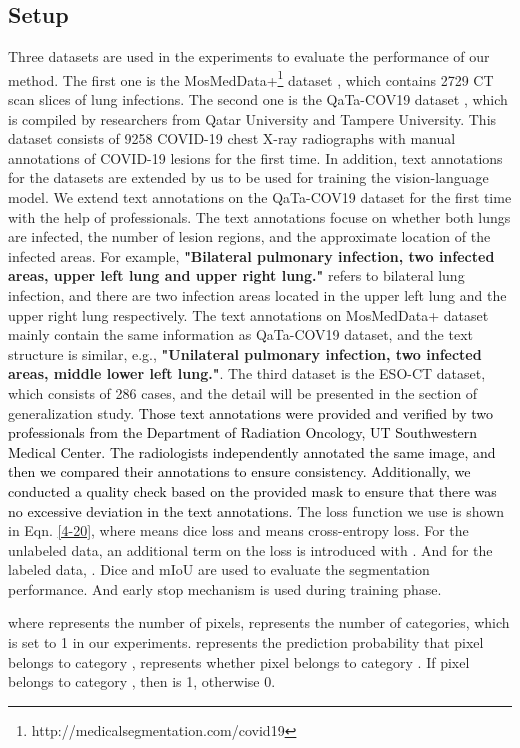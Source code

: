 \documentclass[lettersize,journal]{IEEEtran}
\begin{document}
\subsection{Setup}
Three datasets are used in the experiments to evaluate the performance of our method. The first one is the \renewcommand{\thefootnote}{\arabic{footnote}}{MosMedData+\footnote{http://medicalsegmentation.com/covid19}} dataset \cite{morozov2020mosmeddata,hofmanninger2020automatic}, which contains 2729 CT scan slices of lung infections. The second one is the QaTa-COV19 dataset \cite{48degerli2022osegnet}, which is compiled by researchers from Qatar University and Tampere University. This dataset consists of 9258 COVID-19 chest X-ray radiographs with manual annotations of COVID-19 lesions for the first time. In addition, text annotations for the datasets are extended by us to be used for training the vision-language model. We extend text annotations on the QaTa-COV19 dataset for the first time with the help of professionals. The text annotations focuse on whether both lungs are infected, the number of lesion regions, and the approximate location of the infected areas. 
For example, \textbf{"Bilateral pulmonary infection, two infected areas, upper left lung and upper right lung."} refers to bilateral lung infection, and there are two infection areas located in the upper left lung and the upper right lung respectively. 
The text annotations on MosMedData+ dataset mainly contain the same information as QaTa-COV19 dataset, and the text structure is similar, e.g., \textbf{"Unilateral pulmonary infection, two infected areas, middle lower left lung."}. 
The third dataset is the ESO-CT dataset, which consists of 286 cases, and the detail will be presented in the section of generalization study.
\textcolor{black}{
Those text annotations were provided and verified by two professionals from the Department of Radiation Oncology, UT Southwestern Medical Center. The radiologists independently annotated the same image, and then we compared their annotations to ensure consistency. Additionally, we conducted a quality check based on the provided mask to ensure that there was no excessive deviation in the text annotations.}
The loss function we use is shown in Eqn. \ref{4-20}, where  means dice loss and  means cross-entropy loss. For the unlabeled data, an additional term on the loss  is introduced with . And for the labeled data, .
Dice and mIoU are used to evaluate the segmentation performance. And early stop mechanism is used during training phase.

where  represents the number of pixels,  represents the number of categories, which is set to 1 in our experiments.  represents the prediction probability that pixel  belongs to category ,  represents whether pixel  belongs to category . If pixel  belongs to category , then  is 1, otherwise 0.
\end{document}
